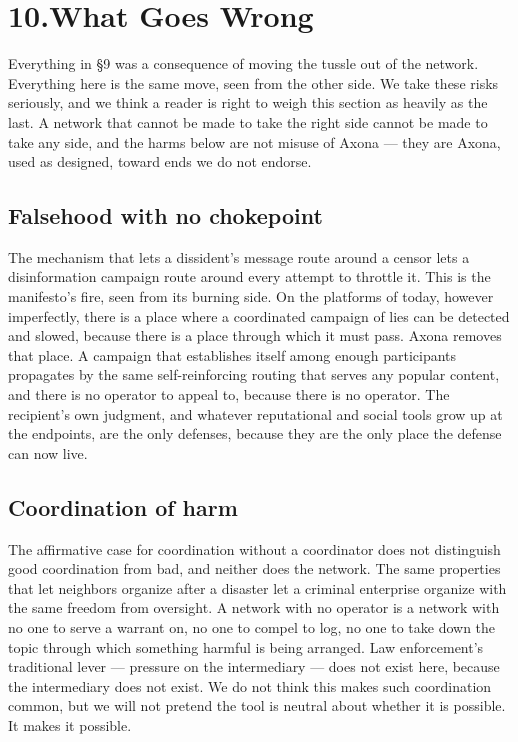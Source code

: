 \documentclass[nobib,justified]{tufte-handout}
\begin{document}
\section{10.\quad What Goes Wrong}

Everything in \S9 was a consequence of moving the tussle out of the
network. Everything here is the same move, seen from the other side. We take
these risks seriously, and we think a reader is right to weigh this section as
heavily as the last. A network that cannot be made to take the right side cannot
be made to take any side, and the harms below are not misuse of Axona --- they
are Axona, used as designed, toward ends we do not endorse.

\subsection{Falsehood with no chokepoint}

The mechanism that lets a dissident's message route around a censor lets a
disinformation campaign route around every attempt to throttle it. This is
the manifesto's fire, seen from its burning side. On the
platforms of today, however imperfectly, there is a place where a coordinated
campaign of lies can be detected and slowed, because there is a place through
which it must pass. Axona removes that place. A campaign that establishes itself
among enough participants propagates by the same self-reinforcing routing that
serves any popular content, and there is no operator to appeal to, because there
is no operator. The recipient's own judgment, and whatever reputational and
social tools grow up at the endpoints, are the only defenses, because they are
the only place the defense can now live.

\subsection{Coordination of harm}

The affirmative case for coordination without a coordinator does not distinguish
good coordination from bad, and neither does the network. The same properties
that let neighbors organize after a disaster let a criminal enterprise organize
with the same freedom from oversight. A network with no operator is a network with
no one to serve a warrant on, no one to compel to log, no one to take down the
topic through which something harmful is being arranged. Law enforcement's
traditional lever --- pressure on the intermediary --- does not exist here,
because the intermediary does not exist. We do not think this makes such
coordination common, but we will not pretend the tool is neutral about whether it
is possible. It makes it possible.
\end{document}
